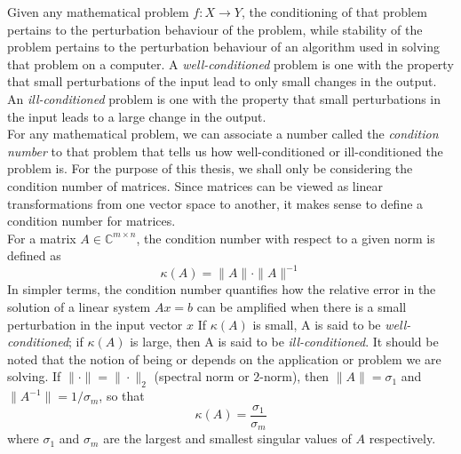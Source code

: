 \documentclass[12pt,gsu,online,openany,singleside,hidelinks]{gsudiss}
\newcommand{\comm}[1]{\added[comment={#1}]{}}
\newcommand{\del}[1]{\deleted[comment={remove}]{#1}}
\newcommand{\rep}[2]{\replaced{#1}{#2}}
\begin{document}
\comm{You labeled this {\tt section1.2.6}.  By using a labeling convention involving specific numbers, you give up all the main benefit of using labels.  You did something similar for labeling equations.  The nice thing about labels is that you get correct references even if you change the order of things or add new sections or equations.  My own convention is that I use a few letters to denote the type of thing I'm labeling, a colon for a separator, and then a more descriptive name.  For this I would have done something like {\tt sec:ConditioningAndStability}, or maybe something a little more abbreviated.  For equations, I usually use {\tt eq:} as a prefix to a descriptive label.  I would keep this section in some form, but I would add some discussion of backward error and how the condition number determines how the backward error impacts a computed solution.}
Given any mathematical problem $f: X \rightarrow Y$, the conditioning of that problem pertains to the perturbation behaviour of the problem, while stability of the problem pertains to the perturbation behaviour of an algorithm used in solving that problem on a computer. A \textit{well-conditioned} problem is one with the property that small perturbations of the input lead to only small changes in the output. An \textit{ill-conditioned} problem is one with the property that small perturbations in the input leads to a large change in the output.\\
For any mathematical problem, we can associate a number called the \textit{condition number} to that problem that tells us how well-conditioned or ill-conditioned the problem is. For the purpose of this thesis, we shall only be considering the condition number of matrices. Since matrices can be viewed as linear transformations from one vector space to another, it makes sense to define a condition number for matrices.\\
For a matrix $A \in \mathbb{C}^{m\times n}$, the condition number with respect to a given norm is defined as\del{:}
\begin{equation}
	\kappa(A) = \|A\| \cdot \|A\|^{-1}
\end{equation}
In simpler terms, the condition number quantifies how the relative error in the solution of a linear system $Ax = b$ can be amplified when there is a small perturbation in the input vector $x$ If $\kappa(A)$ is small, A is said to be \textit{well-conditioned}; if $\kappa(A)$ is large, then A is said to be \textit{ill-conditioned}. It should be noted that the notion of being \rep{``small''}{"small"} or \rep{``large''}{"large"} depends on the application or problem we are solving. If $\| \cdot\| = \| \cdot \|_2$ (spectral norm or $2$-norm), then $\|A\| = \sigma_1$ and $\| A^{-1} \| = 1/\sigma_m$, so that
\begin{equation}
	\kappa(A) = \frac{\sigma_1}{\sigma_m}
\end{equation}
where $\sigma_1$ and $\sigma_m$ are the largest and smallest singular values of $A$ respectively.
\end{document}
